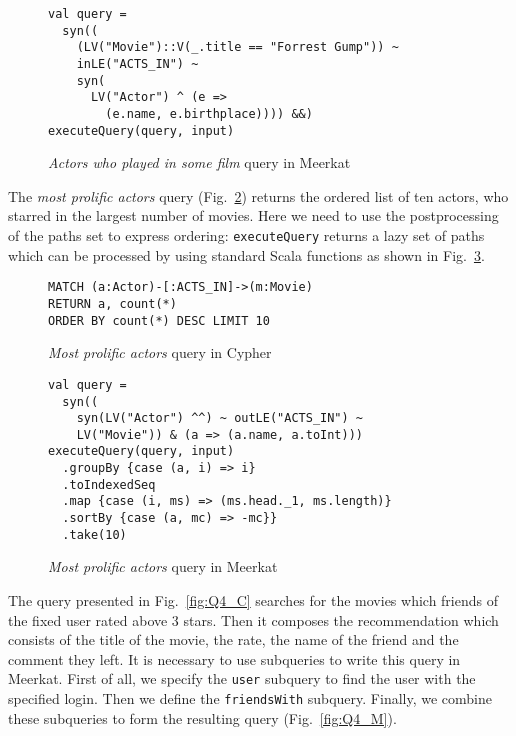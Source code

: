 \begin{figure}[!h]
\begin{lstlisting}
val query =
  syn((
    (LV("Movie")::V(_.title == "Forrest Gump")) ~
    inLE("ACTS_IN") ~
    syn(
      LV("Actor") ^ (e =>
        (e.name, e.birthplace)))) &&)
executeQuery(query, input)
\end{lstlisting}
\caption{\emph{Actors who played in some film} query in Meerkat}
\label{fig:Q1_M}
\end{figure}

The \emph{most prolific actors} query (Fig.~\ref{fig:Q2_C}) returns the ordered list of ten actors, who starred in the largest number of movies.
Here we need to use the postprocessing of the paths set to express ordering: \lstinline{executeQuery} returns a lazy set of paths which can be processed by using standard Scala functions as shown in Fig.~\ref{fig:Q2_M}.

\begin{figure}[!h]
\begin{lstlisting}
MATCH (a:Actor)-[:ACTS_IN]->(m:Movie)
RETURN a, count(*)
ORDER BY count(*) DESC LIMIT 10
\end{lstlisting}
\caption{\emph{Most prolific actors} query in Cypher}
\label{fig:Q2_C}
\end{figure}

\begin{figure}[!h]
\begin{lstlisting}
val query =
  syn((
    syn(LV("Actor") ^^) ~ outLE("ACTS_IN") ~
    LV("Movie")) & (a => (a.name, a.toInt)))
executeQuery(query, input)
  .groupBy {case (a, i) => i}
  .toIndexedSeq
  .map {case (i, ms) => (ms.head._1, ms.length)}
  .sortBy {case (a, mc) => -mc}}
  .take(10)
\end{lstlisting}
\caption{\emph{Most prolific actors} query in Meerkat}
\label{fig:Q2_M}
\end{figure}

The query presented in Fig.~\ref{fig:Q4_C} searches for the movies which friends of the fixed user rated above 3 stars.
Then it composes the recommendation which consists of the title of the movie, the rate, the name of the friend and the comment they left.
It is necessary to use subqueries to write this query in Meerkat.
First of all, we specify the \lstinline{user} subquery to find the user with the specified login.
Then we define the \lstinline{friendsWith} subquery.
Finally, we combine these subqueries to form the resulting query (Fig.~\ref{fig:Q4_M}).


